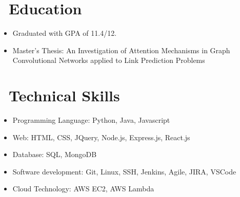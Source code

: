 \documentclass{resume}
\begin{document}



\section{\faGraduationCap\ Education}
\begin{itemize}
	\item Graduated with GPA of 11.4/12.
	\item Master's Thesis: An Investigation of Attention Mechanisms in Graph Convolutional Networks applied to Link Prediction Problems
\end{itemize}
 


\section{\faCogs\ Technical Skills}
\begin{itemize}
	\item Programming Language: Python, Java, Javascript
	\item Web: HTML, CSS, JQuery, Node.js, Express.js, React.js
	\item Database: SQL, MongoDB
	\item Software development: Git, Linux, SSH, Jenkins, Agile, JIRA, VSCode
	\item Cloud Technology: AWS EC2, AWS Lambda
\end{itemize}
\end{document}
